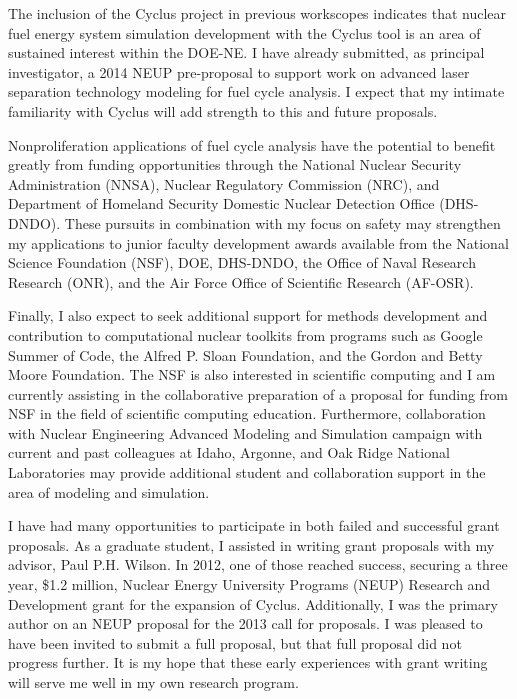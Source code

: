 \documentclass[a4paper, 12pt]{article}
\begin{document}
The inclusion of the Cyclus project in previous workscopes indicates that 
nuclear fuel energy system simulation development with the Cyclus tool is an 
area of sustained interest within the DOE-NE.  I have already submitted, as 
principal investigator, a 2014 NEUP pre-proposal to support work on advanced 
laser separation technology modeling for fuel cycle analysis.  I expect that my 
intimate familiarity with Cyclus will add strength to this and future proposals.  

Nonproliferation applications of fuel cycle analysis have the potential to benefit greatly from funding 
opportunities through the National Nuclear Security Administration (NNSA), 
Nuclear Regulatory Commission (NRC), and Department of Homeland Security 
Domestic Nuclear Detection Office (DHS-DNDO). These pursuits in combination with 
my focus on safety may  strengthen my applications to junior faculty development 
awards available from the National Science Foundation (NSF), DOE, DHS-DNDO, the 
Office of Naval Research Research (ONR), and the Air Force Office of Scientific 
Research (AF-OSR).

Finally, I also expect to seek additional support for methods development and 
contribution to computational nuclear toolkits from programs such as Google 
Summer of Code, the Alfred P. Sloan Foundation, and the Gordon and Betty Moore 
Foundation.  The NSF is also interested in 
scientific computing and I am currently assisting in the collaborative preparation 
of a proposal for funding from NSF in the field of scientific computing 
education. Furthermore, collaboration with Nuclear Engineering Advanced 
Modeling and Simulation campaign with current and past colleagues at Idaho, 
Argonne, and Oak Ridge National Laboratories may provide additional student and 
collaboration support in the area of modeling and simulation. 

I have had many opportunities to participate in both failed and successful grant 
proposals.  As a graduate student, I assisted in writing grant proposals with my 
advisor, Paul P.H. Wilson. In 2012, one of those reached success, securing a 
three year, \$1.2 million, Nuclear Energy University Programs (NEUP) Research 
and Development grant for the expansion of Cyclus. Additionally, I was the 
primary author on an NEUP proposal for the 2013 call for proposals. I was 
pleased to have been invited to submit a full proposal, but that full proposal 
did not progress further. It is my hope that these early experiences with grant 
writing will serve me well in my own research program.






\end{document}
